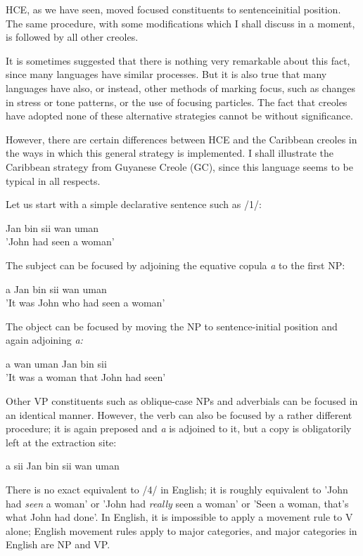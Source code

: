 HCE, as we have seen, moved focused constituents to sentence\-initial position. The same procedure, with some modifications which I shall discuss in a moment, is followed by all other creoles.

It is sometimes suggested that there is nothing very remarkable about this fact, since many languages have similar processes. But it is also true that many languages have also, or instead, other methods of marking focus, such as changes in stress or tone patterns, or the use of focusing particles. The fact that creoles have adopted none of these
alternative strategies cannot be without significance.


However, there are certain differences between HCE and the Caribbean creoles in the ways in which this general strategy is imple\-mented. I shall illustrate the Caribbean strategy from Guyanese Creole (GC), since this language seems to be typical in all respects.

Let us start with a simple declarative sentence such as /1/:

\ea\label{ex:1}
 Jan bin sii wan uman \\
\glt 'John had seen a woman'
\z

The subject can be focused by adjoining the equative copula \textit{a} to the first NP:

\ea\label{ex:2}
 a Jan bin sii wan uman\\
\glt 'It was John who had seen a woman'
\z



The object can be focused by moving the NP to sentence-initial position and again adjoining \textit{a:}

\ea\label{ex:3}
 a wan uman Jan bin sii \\
\glt 'It was a woman that John had seen'
\z



Other VP constituents such as oblique-case NPs and adverbials can be focused in an identical manner. However, the verb can also be focused by a rather different procedure; it is again preposed and \textit{a} is adjoined to it, but a copy is obligatorily left at the extraction site:

\ea\label{ex:4}
 a sii Jan bin sii wan uman
\z

There is no exact equivalent to /4/ in English; it is roughly equivalent to 'John had \textit{seen} a woman' or 'John had \textit{really } seen a woman' or 'Seen a woman, that's what John had done'. In English, it is impossible to apply a movement rule to V alone; English movement rules apply to major categories, and major categories in English are NP and VP.

